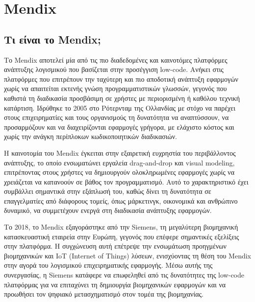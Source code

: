 \chapter{Mendix} \label{ch:mendix}

    \section{Τι είναι το Mendix;}
        Το Mendix αποτελεί μία από τις πιο διαδεδομένες και καινοτόμες πλατφόρμες ανάπτυξης λογισμικού που βασίζεται στην προσέγγιση low-code. Ανήκει στις πλατφόρμες που επιτρέπουν την ταχύτερη και πιο αποδοτική ανάπτυξη εφαρμογών χωρίς να απαιτείται εκτενής γνώση προγραμματιστικών γλωσσών, γεγονός που καθιστά τη διαδικασία προσβάσιμη σε χρήστες με περιορισμένη ή καθόλου τεχνική κατάρτιση. Ιδρύθηκε το 2005 στο Ρότερνταμ της Ολλανδίας με στόχο να παρέχει στους επιχειρηματίες και τους οργανισμούς τη δυνατότητα να αναπτύσσουν, να προσαρμόζουν και να διαχειρίζονται εφαρμογές γρήγορα, με ελάχιστο κόστος και χωρίς την ανάγκη περίπλοκων κωδικοποιητικών διαδικασιών.

        Η καινοτομία του Mendix έγκειται στην εξαιρετική ευχρηστία του περιβάλλοντος ανάπτυξης, το οποίο ενσωματώνει εργαλεία drag-and-drop και visual modeling, επιτρέποντας στους χρήστες να δημιουργούν ολοκληρωμένες εφαρμογές χωρίς να χρειάζεται να κατανοούν σε βάθος τον προγραμματισμό. Αυτό το χαρακτηριστικό έχει συμβάλλει σημαντικά στην εξάπλωσή του, καθώς δίνει τη δυνατότητα σε επαγγελματίες από διάφορους τομείς, όπως μάρκετινγκ, οικονομικά και ανθρώπινο δυναμικό, να συμμετέχουν ενεργά στη διαδικασία ανάπτυξης εφαρμογών.

        Το 2018, το Mendix εξαγοράστηκε από την Siemens, τη μεγαλύτερη βιομηχανική κατασκευαστική εταιρεία στην Ευρώπη, γεγονός που επέφερε σημαντικές εξελίξεις στην πλατφόρμα. Η συγχώνευση αυτή επέτρεψε την ενσωμάτωση προηγμένων βιομηχανικών και IoT (Internet of Things) λύσεων, ενισχύοντας τη θέση του Mendix στην αγορά του λογισμικού επιχειρηματικής εφαρμογής. Μέσω αυτής της συνεργασίας, η Siemens κατάφερε να επωφεληθεί από τις δυνατότητες της low-code πλατφόρμας για να επιταχύνει τη δημιουργία βιομηχανικών εφαρμογών και να προωθήσει τον ψηφιακό μετασχηματισμό στον τομέα της βιομηχανίας.


